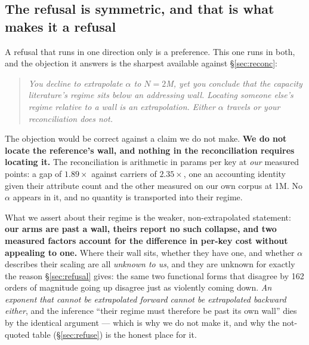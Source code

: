 \subsection{The refusal is symmetric, and that is what makes it a refusal}
\label{sec:symmetric}

A refusal that runs in one direction only is a preference. This one runs in both, and the objection
it answers is the sharpest available against \S\ref{sec:reconc}:

\begin{quote}
\emph{You decline to extrapolate $\alpha$ to $N = 2$M, yet you conclude that the capacity
literature's regime sits below an addressing wall. Locating someone else's regime relative to a wall
is an extrapolation. Either $\alpha$ travels or your reconciliation does not.}
\end{quote}

\noindent The objection would be correct against a claim we do not make. \textbf{We do not locate the
reference's wall, and nothing in the reconciliation requires locating it.} The reconciliation is
arithmetic in params per key at \emph{our} measured points: a gap of $1.89\times$ against carriers of
$2.35\times$, one an accounting identity given their attribute count and the other measured on our
own corpus at 1M. No $\alpha$ appears in it, and no quantity is transported into their regime.

What we assert about their regime is the weaker, non-extrapolated statement: \textbf{our arms are
past a wall, theirs report no such collapse, and two measured factors account for the difference in
per-key cost without appealing to one.} Where their wall sits, whether they have one, and whether
$\alpha$ describes their scaling are all \emph{unknown to us}, and they are unknown for exactly the
reason \S\ref{sec:refusal} gives: the same two functional forms that disagree by 162 orders of
magnitude going up disagree just as violently coming down. \emph{An exponent that cannot be
extrapolated forward cannot be extrapolated backward either}, and the inference ``their regime must
therefore be past its own wall'' dies by the identical argument --- which is why we do not make it,
and why the not-quoted table (\S\ref{sec:refuse}) is the honest place for it.



